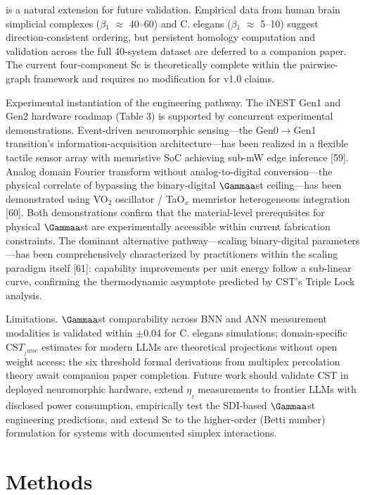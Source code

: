 \documentclass[a4paper,12pt]{article}
\begin{document}
is a natural extension for future validation. Empirical data from human brain simplicial complexes ($\beta$$_1$ $\approx$ 40--60) and C. elegans ($\beta$$_1$ $\approx$ 5--10) suggest direction-consistent ordering, but persistent homology computation and validation across the full 40-system dataset are deferred to a companion paper. The current four-component Sc is theoretically complete within the pairwise-graph framework and requires no modification for v1.0 claims.


Experimental instantiation of the engineering pathway. The iNEST Gen1 and Gen2 hardware roadmap (Table 3) is supported by concurrent experimental demonstrations. Event-driven neuromorphic sensing---the Gen0$\rightarrow$Gen1 transition's information-acquisition architecture---has been realized in a flexible tactile sensor array with memristive SoC achieving sub-mW edge inference [59]. Analog domain Fourier transform without analog-to-digital conversion---the physical correlate of bypassing the binary-digital $\Gammaa$st ceiling---has been demonstrated using VO$_2$ oscillator / TaO$_x$ memristor heterogeneous integration [60]. Both demonstrations confirm that the material-level prerequisites for physical $\Gammaa$st are experimentally accessible within current fabrication constraints. The dominant alternative pathway---scaling binary-digital parameters---has been comprehensively characterized by practitioners within the scaling paradigm itself [61]: capability improvements per unit energy follow a sub-linear curve, confirming the thermodynamic asymptote predicted by CST's Triple Lock analysis.


Limitations. $\Gammaa$st comparability across BNN and ANN measurement modalities is validated within $\pm$0.04 for C. elegans simulations; domain-specific CS$T_{_func}$ estimates for modern LLMs are theoretical projections without open weight access; the six threshold formal derivations from multiplex percolation theory await companion paper completion. Future work should validate CST in deployed neuromorphic hardware, extend $\eta_{_I}$ measurements to frontier LLMs with disclosed power consumption, empirically test the SDI-based $\Gammaa$st engineering predictions, and extend Sc to the higher-order (Betti number) formulation for systems with documented simplex interactions.



\section{Methods}
\end{document}
